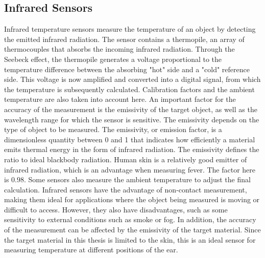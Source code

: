 \subsection{Infrared Sensors}
\label{Background:TemperatureSensors:InfraredSensors}
Infrared temperature sensors measure the temperature of an object by detecting the emitted infrared radiation.
The sensor contains a thermopile, an array of thermocouples that absorbs the incoming infrared radiation. Through the Seebeck effect, the thermopile generates a voltage proportional to the temperature difference between the absorbing "hot" side and a "cold" reference side.
This voltage is now amplified and converted into a digital signal, from which the temperature is subsequently calculated.
Calibration factors and the ambient temperature are also taken into account here.
An important factor for the accuracy of the measurement is the emissivity of the target object, as well as the wavelength range for which the sensor is sensitive. 
The emissivity depends on the type of object to be measured.
The emissivity, or emission factor, is a dimensionless quantity between 0 and 1 that indicates how efficiently a material emits thermal energy in the form of infrared radiation. 
The emissivity defines the ratio to ideal blackbody radiation.
Human skin is a relatively good emitter of infrared radiation, which is an advantage when measuring fever. 
The factor here is $0.98$.
Some sensors also measure the ambient temperature to adjust the final calculation.
Infrared sensors have the advantage of non-contact measurement, making them ideal for applications where the object being measured is moving or difficult to access. However, they also have disadvantages, such as some sensitivity to external conditions such as smoke or fog. In addition, the accuracy of the measurement can be affected by the emissivity of the target material.
Since the target material in this thesis is limited to the skin, this is an ideal sensor for measuring temperature at different positions of the ear.

